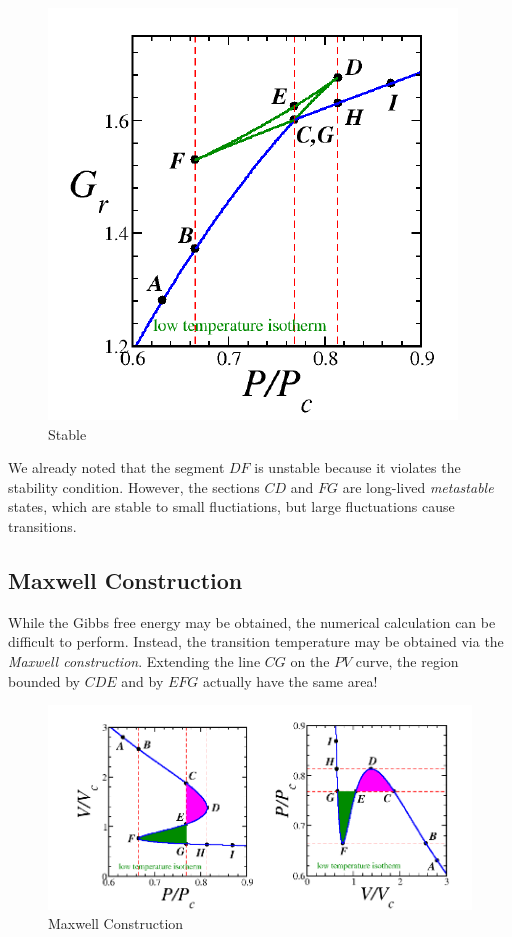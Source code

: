 \begin{figure}[!htbp]
	\begin{center}
		\includegraphics[scale=.65]{diagrams/phase/stab.png}
	\end{center}
	\caption{Stable}\label{fig16:stab}
\end{figure}

We already noted that the segment \(DF\) is unstable because it violates the stability condition. However, the sections \(CD\) and \(FG\) are long-lived \emph{metastable} states, which are stable to small fluctiations, but large fluctuations cause transitions. 

\subsection{Maxwell Construction}
While the Gibbs free energy may be obtained, the numerical calculation can be difficult to perform. Instead, the transition temperature may be obtained via the \emph{Maxwell construction}. Extending the line \(CG\) on the \(PV\) curve, the region bounded by \(CDE\) and by \(EFG\) actually have the same area! 

\begin{figure}[!htbp]
	\begin{center}
		\includegraphics[scale=.7]{diagrams/phase/max.png}
	\end{center}
	\caption{Maxwell Construction}\label{fig16:max}
\end{figure}

